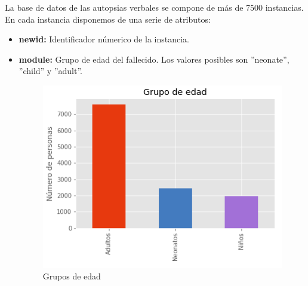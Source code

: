 \documentclass[10pt,a4paper,draft]{article}
\begin{document}
La base de datos de las autopsias verbales se compone de más de 7500 instancias. En cada instancia disponemos de una serie de atributos:

\begin{itemize}
\item \textbf{newid:} Identificador númerico de la instancia.
\item \textbf{module:} Grupo de edad del fallecido. Los valores posibles son ''neonate'', ''child'' y ''adult''.

\begin{figure}[hbtp]
\caption{Grupos de edad}
\centering
\includegraphics[scale=1]{figures/plot_grupo_edad.png}
\end{figure}



\end{itemize}
\end{document}
